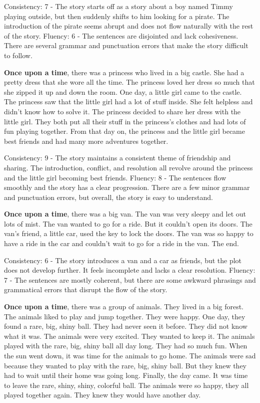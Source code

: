 \documentclass{article}
\begin{document}
Consistency: 7 - The story starts off as a story about a boy named Timmy playing outside, but then suddenly shifts to him looking for a pirate. The introduction of the pirate seems abrupt and does not flow naturally with the rest of the story.
Fluency: 6 - The sentences are disjointed and lack cohesiveness. There are several grammar and punctuation errors that make the story difficult to follow.

\textbf{Once upon a time}, there was a princess who lived in a big castle. She had a pretty dress that she wore all the time. The princess loved her dress so much that she zipped it up and down the room. One day, a little girl came to the castle. The princess saw that the little girl had a lot of stuff inside. She felt helpless and didn't know how to solve it. The princess decided to share her dress with the little girl. They both put all their stuff in the princess's clothes and had lots of fun playing together. From that day on, the princess and the little girl became best friends and had many more adventures together.

Consistency: 9 - The story maintains a consistent theme of friendship and sharing. The introduction, conflict, and resolution all revolve around the princess and the little girl becoming best friends.
Fluency: 8 - The sentences flow smoothly and the story has a clear progression. There are a few minor grammar and punctuation errors, but overall, the story is easy to understand.

\textbf{Once upon a time}, there was a big van. The van was very sleepy and let out lots of mist. The van wanted to go for a ride. But it couldn't open its doors. The van's friend, a little car, used the key to lock the doors. The van was so happy to have a ride in the car and couldn't wait to go for a ride in the van. The end.

Consistency: 6 - The story introduces a van and a car as friends, but the plot does not develop further. It feels incomplete and lacks a clear resolution.
Fluency: 7 - The sentences are mostly coherent, but there are some awkward phrasings and grammatical errors that disrupt the flow of the story.

\textbf{Once upon a time}, there was a group of animals. They lived in a big forest. The animals liked to play and jump together. They were happy. One day, they found a rare, big, shiny ball. They had never seen it before. They did not know what it was. The animals were very excited. They wanted to keep it. The animals played with the rare, big, shiny ball all day long. They had so much fun. When the sun went down, it was time for the animals to go home. The animals were sad because they wanted to play with the rare, big, shiny ball. But they knew they had to wait until their home was going long. Finally, the day came. It was time to leave the rare, shiny, shiny, colorful ball. The animals were so happy, they all played together again. They knew they would have another day.
\end{document}
